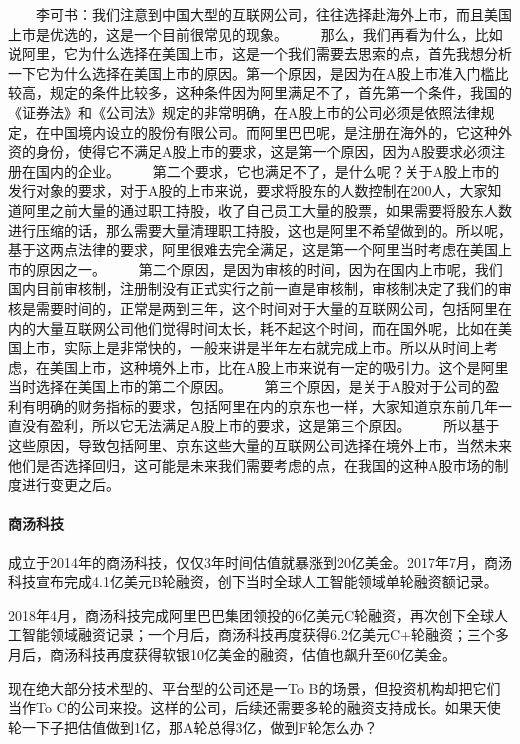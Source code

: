 \documentclass[letterpaper,10pt,english]{sphinxmanual}
\begin{document}
　　李可书：我们注意到中国大型的互联网公司，往往选择赴海外上市，而且美国上市是优选的，这是一个目前很常见的现象。
　　那么，我们再看为什么，比如说阿里，它为什么选择在美国上市，这是一个我们需要去思索的点，首先我想分析一下它为什么选择在美国上市的原因。第一个原因，是因为在A股上市准入门槛比较高，规定的条件比较多，这种条件因为阿里满足不了，首先第一个条件，我国的《证券法》和《公司法》规定的非常明确，在A股上市的公司必须是依照法律规定，在中国境内设立的股份有限公司。而阿里巴巴呢，是注册在海外的，它这种外资的身份，使得它不满足A股上市的要求，这是第一个原因，因为A股要求必须注册在国内的企业。
　　第二个要求，它也满足不了，是什么呢？关于A股上市的发行对象的要求，对于A股的上市来说，要求将股东的人数控制在200人，大家知道阿里之前大量的通过职工持股，收了自己员工大量的股票，如果需要将股东人数进行压缩的话，那么需要大量清理职工持股，这也是阿里不希望做到的。所以呢，基于这两点法律的要求，阿里很难去完全满足，这是第一个阿里当时考虑在美国上市的原因之一。
　　第二个原因，是因为审核的时间，因为在国内上市呢，我们国内目前审核制，注册制没有正式实行之前一直是审核制，审核制决定了我们的审核是需要时间的，正常是两到三年，这个时间对于大量的互联网公司，包括阿里在内的大量互联网公司他们觉得时间太长，耗不起这个时间，而在国外呢，比如在美国上市，实际上是非常快的，一般来讲是半年左右就完成上市。所以从时间上考虑，在美国上市，这种境外上市，比在A股上市来说有一定的吸引力。这个是阿里当时选择在美国上市的第二个原因。
　　第三个原因，是关于A股对于公司的盈利有明确的财务指标的要求，包括阿里在内的京东也一样，大家知道京东前几年一直没有盈利，所以它无法满足A股上市的要求，这是第三个原因。
　　所以基于这些原因，导致包括阿里、京东这些大量的互联网公司选择在境外上市，当然未来他们是否选择回归，这可能是未来我们需要考虑的点，在我国的这种A股市场的制度进行变更之后。


\paragraph{商汤科技}
\label{\detokenize{chapter_knowledge/Valuation:id4}}
成立于2014年的商汤科技，仅仅3年时间估值就暴涨到20亿美金。2017年7月，商汤科技宣布完成4.1亿美元B轮融资，创下当时全球人工智能领域单轮融资额记录。

2018年4月，商汤科技完成阿里巴巴集团领投的6亿美元C轮融资，再次创下全球人工智能领域融资记录；一个月后，商汤科技再度获得6.2亿美元C+轮融资；三个多月后，商汤科技再度获得软银10亿美金的融资，估值也飙升至60亿美金。

现在绝大部分技术型的、平台型的公司还是一To
B的场景，但投资机构却把它们当作To
C的公司来投。这样的公司，后续还需要多轮的融资支持成长。如果天使轮一下子把估值做到1亿，那A轮总得3亿，做到F轮怎么办？
\end{document}
